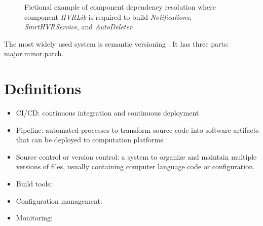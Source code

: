 \documentclass[12pt,dvipsnames]{article}
\begin{document}
\begin{figure}
    \centering
  \caption{Fictional example of component dependency resolution where component \textit{HVRLib} is required to build \textit{Notifications}, \textit{SmrtHVRService}, and \textit{AutoDeleter}}
    \label{fig:dependency-to-build-others}
\end{figure}

The most widely used system is semantic versioning \cite{Wikipedia_software_version}.
It has three parts: major.minor.patch.



\section{Definitions}

\begin{itemize}
    \item CI/CD: continuous integration and continuous deployment 
    \item Pipeline: automated processes to transform source code 
    into software artifacts that can be deployed to computation platforms
    \item Source control or version control: a system to organize and maintain multiple versions of files, usually containing computer language code or configuration.    
    \item Build tools: 
    \item Configuration management:
    \item Monitoring: 
\end{itemize}
\end{document}
